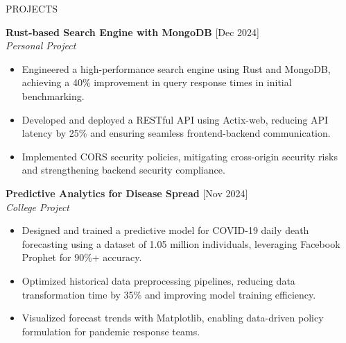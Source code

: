 \documentclass{resume} %
\begin{document}
\begin{rSection}{PROJECTS}

    \textbf{Rust-based Search Engine with MongoDB} \hfill [Dec 2024] \\
    \textit{Personal Project} \vspace{0.1em}
    \begin{itemize}
        \itemsep -3pt
        \item Engineered a high-performance search engine using Rust and MongoDB, achieving a 40\% improvement in query response times in initial benchmarking.
        \item Developed and deployed a RESTful API using Actix-web, reducing API latency by 25\% and ensuring seamless frontend-backend communication.
        \item Implemented CORS security policies, mitigating cross-origin security risks and strengthening backend security compliance.
    \end{itemize}

    \vspace{0.2em}
    \textbf{Predictive Analytics for Disease Spread} \hfill [Nov 2024] \\
    \textit{College Project} \vspace{0.1em}
    \begin{itemize}
        \itemsep -3pt
        \item Designed and trained a predictive model for COVID-19 daily death forecasting using a dataset of 1.05 million individuals, leveraging Facebook Prophet for 90\%+ accuracy.
        \item Optimized historical data preprocessing pipelines, reducing data transformation time by 35\% and improving model training efficiency.
        \item Visualized forecast trends with Matplotlib, enabling data-driven policy formulation for pandemic response teams.
    \end{itemize}

\end{rSection}

\newpage

\end{document}
